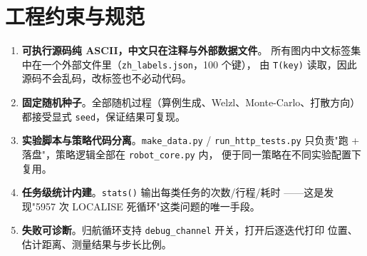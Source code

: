 \section{工程约束与规范}

\begin{enumerate}[leftmargin=1.8em]
  \item \textbf{可执行源码纯 ASCII，中文只在注释与外部数据文件}。
        所有图内中文标签集中在一个外部文件里（\texttt{zh\_labels.json}，100 个键），
        由 \texttt{T(key)} 读取，因此源码不会乱码，改标签也不必动代码。
  \item \textbf{固定随机种子}。全部随机过程（算例生成、Welzl、Monte-Carlo、打散方向）
        都接受显式 \texttt{seed}，保证结果可复现。
  \item \textbf{实验脚本与策略代码分离}。\texttt{make\_data.py} / \texttt{run\_http\_tests.py}
        只负责"跑 + 落盘"，策略逻辑全部在 \texttt{robot\_core.py} 内，
        便于同一策略在不同实验配置下复用。
  \item \textbf{任务级统计内建}。\texttt{stats()} 输出每类任务的次数/行程/耗时
        ——这是发现"5957 次 LOCALISE 死循环"这类问题的唯一手段。
  \item \textbf{失败可诊断}。归航循环支持 \texttt{debug\_channel} 开关，打开后逐迭代打印
        位置、估计距离、测量结果与步长比例。
\end{enumerate}


